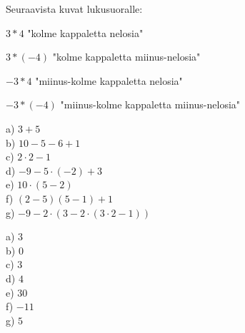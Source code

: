 Seuraavista kuvat lukusuoralle:

$3*4$ "kolme kappaletta nelosia"

$3*(-4)$ "kolme kappaletta miinus-nelosia"

$-3*4$ "miinus-kolme kappaletta nelosia"

$-3*(-4)$ "miinus-kolme kappaletta miinus-nelosia"

\begin{tehtava}
a) $3+5$ \\
b) $10-5-6+1$ \\
c) $2 \cdot 2 - 1$ \\
d) $-9 - 5 \cdot (-2) + 3$ \\
e) $10 \cdot (5 - 2)$ \\
f) $(2-5)(5 - 1) + 1$ \\
g) $-9 - 2 \cdot ( 3 - 2 \cdot (3\cdot2 - 1))$
\begin{vastaus} 
a) $3$ \\
b) $0$ \\
c) $3$ \\
d) $4$ \\
e) $30$ \\
f) $-11$ \\
g) $5$ \\
\end{vastaus}
\end{tehtava}